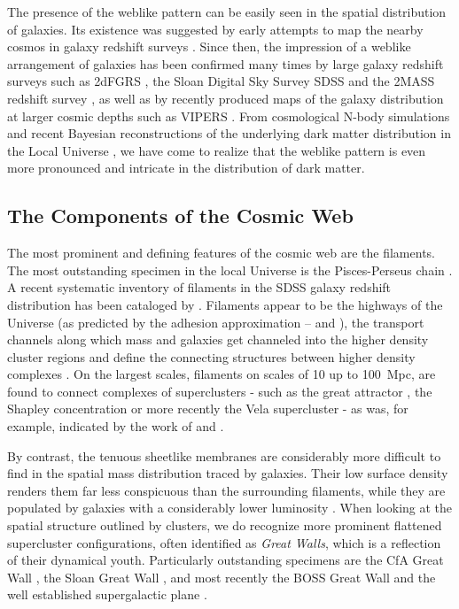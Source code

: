 The presence of the weblike pattern can be easily seen in the spatial distribution of galaxies. Its existence was  suggested 
by early attempts to map the nearby cosmos in galaxy redshift surveys \citep{Gregory1978,Lapparent1986, Geller1989,Shectman1996}. Since then, the impression 
of a weblike arrangement of galaxies has been confirmed many times by large galaxy redshift surveys such as 2dFGRS 
\citep{Colless2003,Weygaert2009}, the Sloan Digital Sky Survey SDSS \citep{Tegmark2003} and the 2MASS redshift survey \citep{Huchra2012}, 
as well as by recently produced maps of the galaxy distribution at larger cosmic depths such as VIPERS \citep{Vipers2014}. 
From cosmological N-body simulations \citep[e.g.][]{Springel2005c,Vogelsberger2014,Schaye2015} and recent Bayesian reconstructions of the 
underlying dark matter distribution in the Local Universe \citep{Hess2013,Kitaura2013}, we have 
come to realize that the weblike pattern is even more pronounced and intricate in the distribution of dark matter.

\subsection{The Components of the Cosmic Web}
The most prominent and defining features of the cosmic web are the filaments. The most outstanding specimen in the local Universe 
is the Pisces-Perseus chain \citep{Giovanelli1985}. A recent systematic inventory of filaments in the SDSS galaxy redshift 
distribution has been cataloged by \cite{Tempel2014} \cite[also see][]{Jones2010,Sousbie2011e}. Filaments appear to be the highways of the Universe (as predicted by the adhesion approximation --  \citealt{Gurbatov1989} and \citealt{Shandarin1989}), 
the transport channels along which mass and galaxies get channeled into the higher density cluster regions \citep{Haarlem1993} and define the connecting structures between higher density complexes \citep{Bond1996,Colberg2005,Weygaert2009,Aragon-Calvo2010a}. On the largest 
scales, filaments on scales of 10 up to 100~Mpc, are found to connect complexes of superclusters - such as the great attractor 
\citep{1988ApJ...326...19L}, the Shapley concentration 
\citep{1930BHarO.874....9S,2006A&A...447..133P} or more recently the Vela supercluster \citep{2017MNRAS.466L..29K} - as was, for example, indicated by the work of \cite{2004ApJ...606...25B} and \cite{Libeskind2015}. 

By contrast, the tenuous sheetlike membranes are considerably more difficult to find in the spatial mass distribution traced by 
galaxies. Their low surface density renders them far less conspicuous than the surrounding filaments, while they are populated 
by galaxies with a considerably lower luminosity \citep[see e.g.][]{Cautun2014a}. When looking at the spatial structure outlined by 
clusters, we do recognize more prominent flattened supercluster configurations, often identified as \emph{Great Walls}, which 
is a reflection of their dynamical youth. Particularly outstanding specimens are the 
CfA Great Wall \citep{Geller1989}, the Sloan Great Wall \citep{2005ApJ...624..463G}, and most recently the BOSS 
Great Wall \citep{2016A&A...588L...4L} and the well established supergalactic plane \citep{1953AJ.....58...30D,2000MNRAS.312..166L}. 

